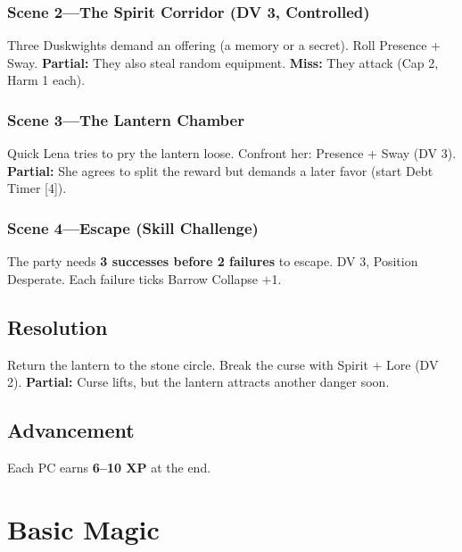 \documentclass[10pt,twocolumn]{article} %
\begin{document}
\subsubsection{Scene 2---The Spirit Corridor (DV 3, Controlled)}
Three Duskwights demand an offering (a memory or a secret). Roll Presence + Sway. \textbf{Partial:} They also steal random equipment. \textbf{Miss:} They attack (Cap 2, Harm 1 each).

\subsubsection{Scene 3---The Lantern Chamber}
Quick Lena tries to pry the lantern loose. Confront her: Presence + Sway (DV 3). \textbf{Partial:} She agrees to split the reward but demands a later favor (start Debt Timer [4]).

\subsubsection{Scene 4---Escape (Skill Challenge)}
The party needs \textbf{3 successes before 2 failures} to escape. DV 3, Position Desperate. Each failure ticks Barrow Collapse +1.

\subsection{Resolution}
Return the lantern to the stone circle. Break the curse with Spirit + Lore (DV 2). \textbf{Partial:} Curse lifts, but the lantern attracts another danger soon.

\subsection{Advancement}
Each PC earns \textbf{6--10 XP} at the end.

\section{Basic Magic}
\end{document}
